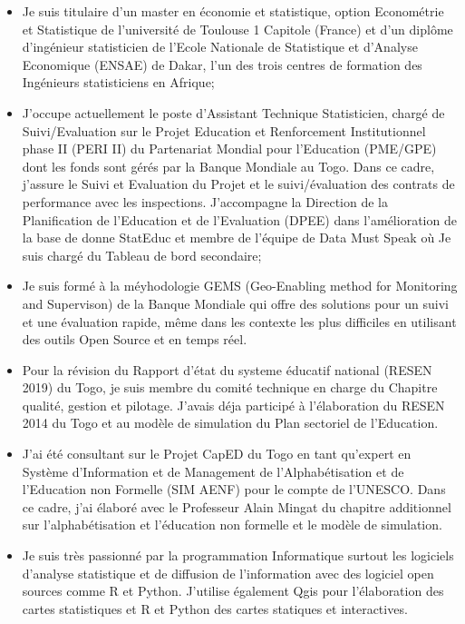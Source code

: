 \documentclass[11pt, a4paper]{awesome-cv}
\begin{document}
\begin{cvletter}
\begin{itemize}
\item Je suis titulaire d’un master en économie et statistique, option Econométrie et Statistique de l’université de Toulouse 1 Capitole (France) et d’un diplôme d’ingénieur statisticien de l’Ecole Nationale de Statistique et d’Analyse Economique (ENSAE) de Dakar, l’un des trois centres de formation des Ingénieurs statisticiens en Afrique;
\item J’occupe actuellement le poste d’Assistant Technique Statisticien, chargé de Suivi/Evaluation sur le Projet Education et Renforcement Institutionnel phase II (PERI II) du Partenariat Mondial pour l’Education (PME/GPE) dont les fonds sont gérés par la Banque Mondiale au Togo. Dans ce cadre, j’assure le Suivi et Evaluation du Projet et le suivi/évaluation des contrats de performance avec les inspections. J'accompagne la Direction de la Planification de l'Education et de l'Evaluation (DPEE) dans l'amélioration de la base de donne StatEduc et membre de l'équipe de Data Must Speak où Je suis chargé du Tableau de bord secondaire;
\item Je suis formé à la méyhodologie GEMS (Geo-Enabling method for Monitoring and Supervison) de la Banque Mondiale qui offre des solutions pour un suivi et une évaluation rapide, même dans les contexte les plus difficiles en utilisant des outils Open Source et en temps réel.
\item Pour la révision du Rapport d'état du systeme éducatif national (RESEN 2019) du Togo, je suis membre du comité technique en charge du Chapitre qualité, gestion et pilotage. J'avais déja participé à l'élaboration du RESEN 2014 du Togo et au modèle de simulation du Plan sectoriel de l'Education.
\item J’ai été consultant sur le Projet CapED du Togo en tant qu’expert en Système d’Information et de Management de l’Alphabétisation et de l’Education non Formelle (SIM AENF) pour le compte de l’UNESCO. Dans ce cadre, j'ai élaboré avec le Professeur Alain Mingat du chapitre additionnel sur l'alphabétisation et l'éducation non formelle et le modèle de simulation.

\item Je suis très passionné par la programmation Informatique surtout les logiciels d'analyse statistique et de diffusion de l'information avec des logiciel open sources  comme R et Python. J'utilise également Qgis pour l'élaboration des cartes statistiques et R et Python des cartes statiques et  interactives.
\end{itemize}


\end{cvletter}
\end{document}
